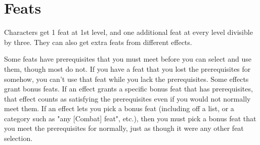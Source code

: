\chapter{Feats}

Characters get 1 feat at 1st level, and one additional feat at every level divisible by three. They can also get extra feats from different effects.

Some feats have prerequisites that you must meet before you can select and use them, though most do not. If you have a feat that you lost the prerequisites for somehow, you can't use that feat while you lack the prerequisites. Some effects grant bonus feats. If an effect grants a specific bonus feat that has prerequisites, that effect counts as satisfying the prerequisites even if you would not normally meet them. If an effect lets you pick a bonus feat (including off a list, or a category such as "any [Combat] feat", etc.), then you must pick a bonus feat that you meet the prerequisites for normally, just as though it were any other feat selection.












